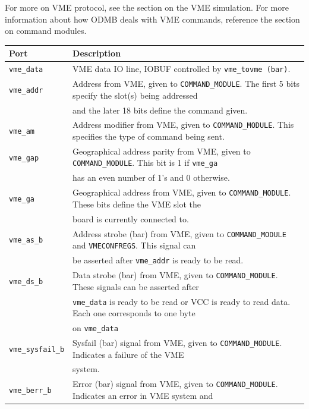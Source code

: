 \documentclass[10pt,a4paper]{article}
\begin{document}
For more on VME protocol, see the section on the VME simulation. For more information about how ODMB deals with VME commands, reference the section on command modules. 

\begin{table}[H]
\begin{tabular}{|l|l|} \hline
Port& Description\\ \hline
\texttt{vme\_data}& VME data IO line, IOBUF controlled by \texttt{vme\_tovme (bar)}.\\ \hline
\texttt{vme\_addr}& Address from VME, given to \texttt{COMMAND\_MODULE}. The first 5 bits specify the slot(s) being addressed\\
                  & and the later 18 bits define the command given.\\ \hline
\texttt{vme\_am}& Address modifier from VME, given to \texttt{COMMAND\_MODULE}. This specifies the type of command being sent.\\ \hline
\texttt{vme\_gap}& Geographical address parity from VME, given to \texttt{COMMAND\_MODULE}. This bit is 1 if \texttt{vme\_ga} \\
                & has an even number of 1's and 0 otherwise. \\ \hline
\texttt{vme\_ga}& Geographical address from VME, given to \texttt{COMMAND\_MODULE}. These bits define the VME slot the\\
                 & board is currently connected to.\\ \hline
\texttt{vme\_as\_b}& Address strobe (bar) from VME, given to \texttt{COMMAND\_MODULE} and \texttt{VMECONFREGS}. This signal can \\
                   & be asserted after \texttt{vme\_addr} is ready to be read.\\ \hline
\texttt{vme\_ds\_b}& Data strobe (bar) from VME, given to \texttt{COMMAND\_MODULE}. These signals can be asserted after \\
                   & \texttt{vme\_data} is ready to be read or VCC is ready to read data. Each one corresponds to one byte \\
									 & on \texttt{vme\_data}\\ \hline
\texttt{vme\_sysfail\_b}& Sysfail (bar) signal from VME, given to \texttt{COMMAND\_MODULE}. Indicates a failure of the VME \\
                        & system.\\ \hline
\texttt{vme\_berr\_b}& Error (bar) signal from VME, given to \texttt{COMMAND\_MODULE}. Indicates an error in VME system and \\

\end{tabular}
\end{table}
\end{document}
